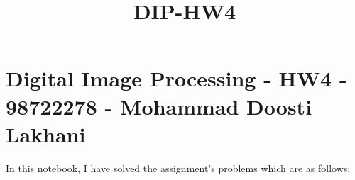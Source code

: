 \documentclass[11pt]{article}
\title{DIP-HW4}
\begin{document}
    
    
    \maketitle
    
    

    
    \hypertarget{digital-image-processing---hw4---98722278---mohammad-doosti-lakhani}{%
\section{Digital Image Processing - HW4 - 98722278 - Mohammad Doosti
Lakhani}\label{digital-image-processing---hw4---98722278---mohammad-doosti-lakhani}}

In this notebook, I have solved the assignment's problems which are as
follows:
\end{document}
